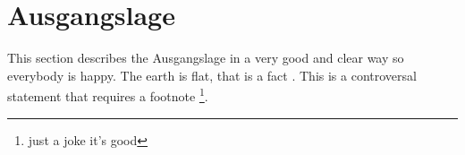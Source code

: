 \chapter{Ausgangslage}
This section describes the Ausgangslage in a very good and clear way so everybody is happy. The earth is flat, that is a fact \cite{something}.
This is a controversal statement that requires a footnote \footnote{just a joke it's good}.